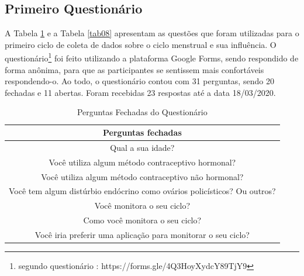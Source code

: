 \subsection{Primeiro Questionário}

A Tabela \ref{tab07} e a Tabela \ref{tab08} apresentam as questões que foram utilizadas para o primeiro ciclo de coleta de dados sobre o ciclo menstrual e 
sua influência. O questionário\footnote{segundo questionário : https://forms.gle/4Q3HoyXydcY89TjY9} foi feito utilizando a plataforma Google Forms, sendo respondido de forma anônima, para que as
participantes se sentissem mais confortáveis respondendo-o. Ao todo, o questionário contou com 31 perguntas, sendo 20 fechadas e 
11 abertas. Foram recebidas 23 respostas até a data 18/03/2020.

\begin{table}[ht]
    \centering
    \caption{Perguntas Fechadas do Questionário}
    \label{tab07}
    \begin{tabular}{c}
        \toprule
        \textbf{Perguntas fechadas} \\
        \midrule
        \begin{minipage} [t] {1\textwidth} Qual a sua idade?  \end{minipage} \\
        \midrule
        \begin{minipage} [t] {1\textwidth} Você utiliza algum método contraceptivo hormonal?   \end{minipage}\\
        \midrule
        \begin{minipage} [t] {1\textwidth} Você utiliza algum método contraceptivo não hormonal?  \end{minipage} \\
        \midrule
        \begin{minipage} [t] {1\textwidth}  Você tem algum distúrbio endócrino como ovários policísticos? Ou outros? \end{minipage}  \\
        \midrule
        \begin{minipage} [t] {1\textwidth}  Você monitora o seu ciclo? \end{minipage}\\
        \midrule
        \begin{minipage} [t] {1\textwidth}  Como você monitora o seu ciclo? \end{minipage} \\
        \midrule
        \begin{minipage} [t] {1\textwidth}  Você iria preferir uma aplicação para monitorar o seu ciclo?\end{minipage}\\

\end{tabular}
\end{table}
